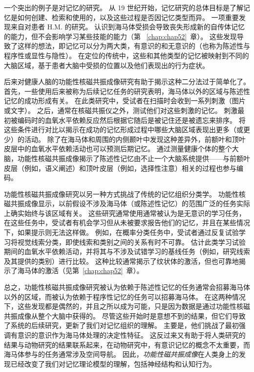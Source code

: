 一个突出的例子是对记忆的研究。 
从 19 世纪开始，记忆研究的总体目标是了解记忆是如何创建、检索和使用的，以及这些过程是否因记忆类型而异。 
一项重要发现来自对患者 H.M. 的研究。 
认识到海马体受损会导致丧失形成新的自传体记忆的能力，但不会影响学习某些技能的能力（第 ~\ref{chap:chap52}~章）。
这些发现导致了这样的想法，即记忆可以分为两大类，有意识的和无意识的（也称为陈述性与程序性或显性与隐性）。
在定位的传统中，这些和其他类型的记忆被映射到不同的大脑区域，基于患者大脑中受损的位置以及他们表现出的行为症状。


后来对健康人脑的功能性核磁共振成像研究有助于揭示这种二分法过于简单化了。
首先，一些使用后来被称为后续记忆任务的研究表明，海马体以外的区域与陈述性记忆的成功形成有关。
在此类研究中，受试者在扫描时会收到一系列刺激（图片或文字）。
之后，通常在核磁共振仪之外，测试他们对这些刺激的记忆。
刺激最初被编码时的血氧水平依赖反应然后根据它随后是被记住还是被遗忘来排序。
将这些条件进行对比以揭示在成功的记忆形成过程中哪些大脑区域表现出更多（或更少）的活动。
除了在海马体和周围的内侧颞叶中发现这种差异外，前额叶和顶叶皮层中的血氧水平依赖活动也可以预测后期记忆。 
通过测量健康个体的整个大脑，功能性核磁共振成像揭示了陈述性记忆由不止一个大脑系统提供——与前额叶皮层（例如，语义阐述）和顶叶皮层（例如，选择性注意）相关的过程也参与编码。


功能性核磁共振成像研究以另一种方式挑战了传统的记忆组织分类学。
功能性核磁共振成像显示，以前假设不涉及海马体（或陈述性记忆）的范围广泛的任务实际上确实始终与该区域有关。
这些研究通常使用通常被认为是无意识的学习任务，在这些任务中，受试者有机会学习但从未被要求报告他们的记忆，并且在某些情况下，如果提示则无法这样做。
例如，在概率分类任务中，受试者通过反复试验学习将视觉线索分类，即使线索和类别之间的关系有时不可靠。
估计此类学习试验期间的血氧水平依赖活动，并将其与不涉及试错学习的基线任务（例如，研究线索及其提供的类别）进行比较。
这种比较通常揭示了纹状体的激活，但也可靠地揭示了海马体的激活（见第~\ref{chap:chap52}~章）。


总之，功能性核磁共振成像研究被认为依赖于陈述性记忆的任务通常会招募海马体以外的区域，而被认为依赖于程序性记忆的任务可以招募海马体。
在这两种情况下，这些发现都是偶然的，并且之所以成为可能，只是因为数据是通过功能性核磁共振成像从整个大脑中获得的。
尽管这些开始时是意想不到的结果，但它们导致了系统的后续研究，更新了我们对记忆组织的理解。
主要是，他们挑战了最初强调有意识的意识作为海马体处理的决定性特征。
这反过来又有助于将人类研究的结果与动物研究的结果联系起来，在动物研究中，有意识记忆的概念不太重要，而海马体参与的任务通常涉及空间导航。
因此，\textit{功能性磁共振成像}在人类身上的发现已经改变了我们对记忆理论模型的理解，包括神经结构和认知行为。



